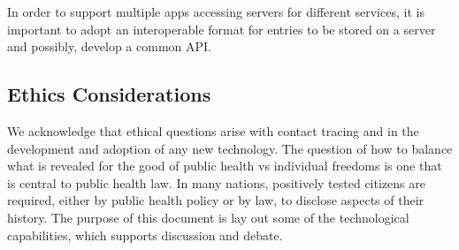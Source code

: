 \documentclass{article}
\begin{document}
In order to support multiple apps accessing servers for different services, it is important to adopt an interoperable format for entries to be stored on a server and possibly, develop a common API.

\subsection{Ethics Considerations}
We acknowledge that ethical questions arise with contact tracing and in the development and adoption of any new technology. The question of how to balance what is revealed for the good of public health vs individual freedoms is one that is central to public health law. In many nations, positively tested citizens are required, either by public health policy or by law, 
to disclose aspects of their history.  The purpose of this document is lay out some of the technological capabilities, which supports discussion and debate.

\end{document}
